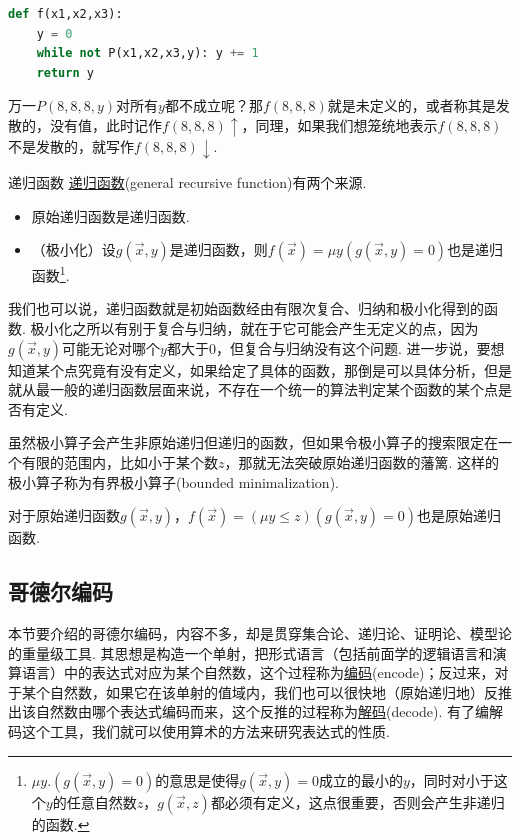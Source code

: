 \begin{lstlisting}[language = Python]
def f(x1,x2,x3):
    y = 0
    while not P(x1,x2,x3,y): y += 1
    return y
\end{lstlisting}

万一\(P(8,8,8,y)\)对所有\(y\)都不成立呢？那\(f(8,8,8)\)就是未定义的，或者称其是发散的，没有值，此时记作\(f(8,8,8)\uparrow\)，同理，如果我们想笼统地表示\(f(8,8,8)\)不是发散的，就写作\(f(8,8,8)\downarrow\). 

\begin{definition}{递归函数}
    \underline{递归函数}(general recursive function)有两个来源.
    \begin{itemize}
        \item 原始递归函数是递归函数.
        \item （极小化）设\(g(\vec x,y)\)是递归函数，则\(f(\vec x)=\mu y (g(\vec x, y)=0)\)也是递归函数\footnote{\(\mu y. (g(\vec x, y)=0)\)的意思是使得\(g(\vec x,y)=0\)成立的最小的\(y\)，同时对小于这个\(y\)的任意自然数\(z\)，\(g(\vec x,z)\)都必须有定义，这点很重要，否则会产生非递归的函数.}.
    \end{itemize}
\end{definition}

我们也可以说，递归函数就是初始函数经由有限次复合、归纳和极小化得到的函数. 极小化之所以有别于复合与归纳，就在于它可能会产生无定义的点，因为\(g(\vec x, y)\)可能无论对哪个\(y\)都大于\(0\)，但复合与归纳没有这个问题. 进一步说，要想知道某个点究竟有没有定义，如果给定了具体的函数，那倒是可以具体分析，但是就从最一般的递归函数层面来说，不存在一个统一的算法判定某个函数的某个点是否有定义.

虽然极小算子会产生非原始递归但递归的函数，但如果令极小算子的搜索限定在一个有限的范围内，比如小于某个数\(z\)，那就无法突破原始递归函数的藩篱. 这样的极小算子称为有界极小算子(bounded minimalization).

\begin{proposition}{}
    对于原始递归函数\(g(\vec x,y)\)，\(f(\vec x) = (\mu y \leq z)(g(\vec x,y)=0)\)也是原始递归函数.
\end{proposition}

\subsection{哥德尔编码}

本节要介绍的哥德尔编码，内容不多，却是贯穿集合论、递归论、证明论、模型论的重量级工具. 其思想是构造一个单射，把形式语言（包括前面学的逻辑语言和演算语言）中的表达式对应为某个自然数，这个过程称为\underline{编码}(encode)；反过来，对于某个自然数，如果它在该单射的值域内，我们也可以很快地（原始递归地）反推出该自然数由哪个表达式编码而来，这个反推的过程称为\underline{解码}(decode). 有了编解码这个工具，我们就可以使用算术的方法来研究表达式的性质. 

